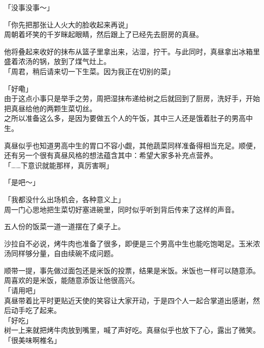 「没事没事～」

「你先把那张让人火大的脸收起来再说」\\

周朝着坏笑的千岁眯起眼睛，然后跟上了已经先去厨房的真昼。

他将叠起来收好的抹布从篮子里拿出来，沾湿，拧干。与此同时，真昼拿出冰箱里盛着浓汤的锅，放到了煤气灶上。\\

「周君，稍后请来切一下生菜。因为我正在切别的菜」

「好嘞」\\

由于这点小事只是举手之劳，周把湿抹布递给树之后就回到了厨房，洗好手，开始把真昼给他的两颗生菜切丝。\\

之所以准备这么多，是因为要做五个人的午饭，其中三人还是饿着肚子的男高中生。

真昼似乎也知道男高中生的胃口不容小觑，其他蔬菜同样准备得相当充足。顺便，还有另一个很有真昼风格的想法蕴含其中：希望大家多补充点营养。\\

「……下意识就能那样，真厉害啊」

「是吧～」

「我都没什么出场机会，各种意义上」\\

周一门心思地把生菜切好塞进碗里，同时似乎听到背后传来了这样的声音。\\

\vspace{2\baselineskip}

五人份的饭菜一道一道摆在了桌子上。

沙拉自不必说，烤牛肉也准备了很多，即便是三个男高中生也能吃饱喝足。玉米浓汤同样够分量，自由续碗不成问题。

顺带一提，事先做过面包还是米饭的投票，结果是米饭。米饭也一样可以随意添。周喜欢的是米饭，能随意添饭让他很高兴。\\

「请用吧」\\

真昼带着比平时更贴近天使的笑容让大家开动，于是四个人一起合掌道出感谢，然后动手吃了起来。\\

「好吃」\\

树一上来就把烤牛肉放到嘴里，喊了声好吃。真昼似乎也放下了心，露出了微笑。\\

「很美味啊椎名」

